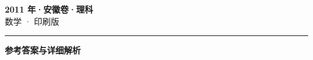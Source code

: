 \documentclass[zihao=5, a4paper]{ctexart}
\begin{document}
\begin{center}
  {\Large\bfseries 2011 年·安徽卷·理科}\\[4pt]
  {\large 数学 · 印刷版}
\end{center}
\medskip
{}

\par\bigskip\hrule\bigskip
{}
\begin{center}{\large\bfseries 参考答案与详细解析}\end{center}
\smallskip

\end{document}
